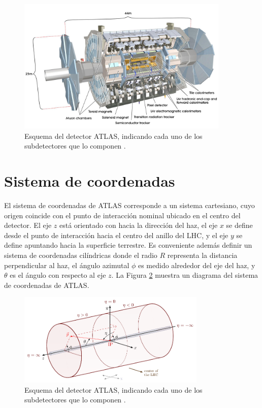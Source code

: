 \begin{figure}
\centering
  \includegraphics[width=0.9\textwidth]{images/lhc/atlas_1.jpg}
  \caption{Esquema del detector ATLAS, indicando cada uno de los subdetectores que lo componen \cite{Pequenao:1095924}.}
  \label{fig:atlas_1}
\end{figure}

\section{Sistema de coordenadas}

El sistema de coordenadas de ATLAS corresponde a un sistema cartesiano, cuyo origen coincide con el punto de interacción nominal ubicado en el centro del detector. El eje $z$ está orientado con hacia la dirección del haz, el eje $x$ se define desde el punto de interacción hacia el centro del anillo del LHC, y el eje $y$ se define apuntando hacia la superficie terrestre. Es conveniente además definir un sistema de coordenadas cilíndricas donde el radio $R$ representa la distancia perpendicular al haz, el ángulo azimutal $\phi$ es medido alrededor del eje del haz, y $\theta$ es el ángulo con respecto al eje $z$. La Figura \ref{fig:atlas_coordinates} muestra un diagrama del sistema de coordenadas de ATLAS.

\begin{figure}
\centering
  \includegraphics[width=0.8\textwidth]{images/lhc/atlas_coordinates2.pdf}
  \caption{Esquema del detector ATLAS, indicando cada uno de los subdetectores que lo componen \cite{atlas_coordinates}.}
  \label{fig:atlas_coordinates}
\end{figure}


